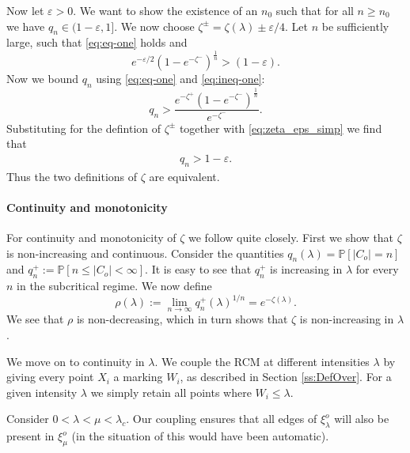 \documentclass[a4paper,12pt]{scrartcl}
\renewcommand{\P}{\mathbb{P}}
\newcommand{\eps}{\varepsilon}
\theoremstyle{definition}
\theoremstyle{remark}
\begin{document}
  Now let $\eps>0$. We want to show the existence of an $n_0$ such that for all $n\geq n_0$ we have $q_n\in(1-\eps,1]$. We now choose $\zeta^\pm =\zeta(\lambda)\pm \eps/4$. Let $n$ be sufficiently large, such that \eqref{eq:eq-one} holds and
  \begin{equation}\label{eq:zeta_eps_simp}
    e^{-\eps/2}(1-e^{-\zeta^-})^\frac{1}{n}
    >
    (1-\eps).
  \end{equation}
  Now we bound $q_n$ using \eqref{eq:eq-one} and \eqref{eq:ineq-one}:
  \begin{equation*}
    q_n
    >
    \frac
    {e^{-\zeta^+}(1-e^{-\zeta^-})^{\frac1n}}
    {e^{-\zeta^-}}.
  \end{equation*}
  Substituting for the defintion of $\zeta^\pm$ together with \eqref{eq:zeta_eps_simp} we find that
  \begin{align*}
    q_n
    >
    1-\eps.
  \end{align*}
  Thus the two definitions of $\zeta$ are equivalent.

  \paragraph{Continuity and monotonicity}
  For continuity and monotonicity of $\zeta$ we follow \cite[Theorem 10.1]{penrose2003random} quite closely.
  First we show that $\zeta$ is non-increasing and continuous. Consider the quantities $q_n(\lambda) = \P[|C_o|=n]$ and $q^+_n:= \P[n\leq| C_o|< \infty]$. It is easy to see that $q^+_n$ is increasing in $\lambda$ for every $n$ in the subcritical regime. We now define
  $$\rho(\lambda)
  :=
  \lim_{n\to\infty} q^+_n(\lambda)^{1/n}
  =
  e^{-\zeta(\lambda)}.
  $$
  We see that $\rho$ is non-decreasing, which in turn shows that $\zeta$ is non-increasing in $\lambda$.

  We move on to continuity in $\lambda$. We couple the RCM at different intensities $\lambda$ by giving every point $X_i$ a marking $W_i$, as described in Section \ref{ss:DefOver}.
  For a given intensity $\lambda$ we simply retain all points where $W_i\leq \lambda$.

  Consider $0<\lambda<\mu<\lambda_c$.
  Our coupling ensures that all edges of $\xi^o_\lambda$ will also
  be present  in $\xi^o_\mu$ (in the situation of \cite{penrose2003random}
  this would have been automatic).
\end{document}
